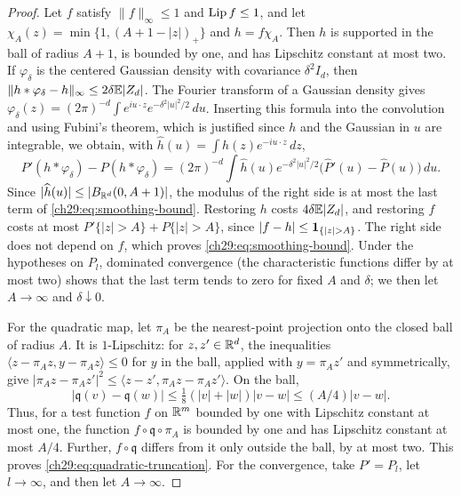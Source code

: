 \begin{proof}
Let $f$ satisfy $\|f\|_\infty\le1$ and $\operatorname{Lip} f\le1$, and let $\chi_A(z)=\min\{1,(A+1-|z|)_+\}$ and $h=f\chi_A$. Then $h$ is supported in the ball of radius $A+1$, is bounded by one, and has Lipschitz constant at most two. If $\varphi_\delta$ is the centered Gaussian density with covariance $\delta^2I_d$, then $\|h*\varphi_\delta-h\|_\infty\le2\delta\mathbb E|Z_d|$. The Fourier transform of a Gaussian density gives $\varphi_\delta(z)=(2\pi)^{-d}\int e^{iu\cdot z}e^{-\delta^2|u|^2/2}\,du$. Inserting this formula into the convolution and using Fubini's theorem, which is justified since $h$ and the Gaussian in $u$ are integrable, we obtain, with $\widehat h(u)=\int h(z)e^{-iu\cdot z}\,dz$,
\[
 P'(h*\varphi_\delta)-P(h*\varphi_\delta)=(2\pi)^{-d}\int\widehat h(u)e^{-\delta^2|u|^2/2}\bigl(\widehat P'(u)-\widehat P(u)\bigr)\,du.
\]
Since $|\widehat h(u)|\le|B_{\mathbb R^d}(0,A+1)|$, the modulus of the right side is at most the last term of \eqref{ch29:eq:smoothing-bound}. Restoring $h$ costs $4\delta\mathbb E|Z_d|$, and restoring $f$ costs at most $P'\{|z|>A\}+P\{|z|>A\}$, since $|f-h|\le\one_{\{|z|>A\}}$. The right side does not depend on $f$, which proves \eqref{ch29:eq:smoothing-bound}. Under the hypotheses on $P_l$, dominated convergence (the characteristic functions differ by at most two) shows that the last term tends to zero for fixed $A$ and $\delta$; we then let $A\to\infty$ and $\delta\downarrow0$.

For the quadratic map, let $\pi_A$ be the nearest-point projection onto the closed ball of radius $A$. It is $1$-Lipschitz: for $z,z'\in\mathbb R^d$, the inequalities $\langle z-\pi_Az,y-\pi_Az\rangle\le0$ for $y$ in the ball, applied with $y=\pi_Az'$ and symmetrically, give $|\pi_Az-\pi_Az'|^2\le\langle z-z',\pi_Az-\pi_Az'\rangle$. On the ball,
\[
 |\mathfrak q(v)-\mathfrak q(w)|\le\tfrac18(|v|+|w|)|v-w|\le(A/4)|v-w|.
\]
Thus, for a test function $f$ on $\mathbb R^m$ bounded by one with Lipschitz constant at most one, the function $f\circ\mathfrak q\circ\pi_A$ is bounded by one and has Lipschitz constant at most $A/4$. Further, $f\circ\mathfrak q$ differs from it only outside the ball, by at most two. This proves \eqref{ch29:eq:quadratic-truncation}. For the convergence, take $P'=P_l$, let $l\to\infty$, and then let $A\to\infty$.
\end{proof}

